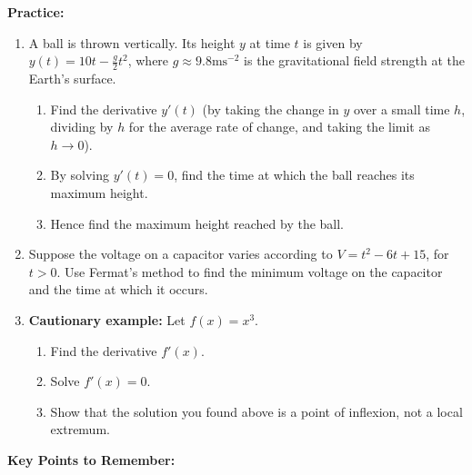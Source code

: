 \documentclass{article}
\begin{document}
\clearpage




\textbf{Practice:}

\vspace{5mm}


\begin{enumerate}
	\item A ball is thrown vertically. Its height $y$ at time $t$ is given by $y(t)=10t-\frac{g}{2}t^2$, where $g\approx 9.8\mathrm{ms}^{-2}$ is the gravitational field strength at the Earth's surface.
		\begin{enumerate}
			\item Find the derivative $y'(t)$ (by taking the change in $y$ over a small time $h$, dividing by $h$ for the average rate of change, and taking the limit as $h\to 0$).
			\item By solving $y'(t)=0$, find the time at which the ball reaches its maximum height.
			\item Hence find the maximum height reached by the ball.
		\end{enumerate}
	\item Suppose the voltage on a capacitor varies according to $V=t^2-6t+15$, for $t>0$. Use Fermat's method to find the minimum voltage on the capacitor and the time at which it occurs.
	\item \textbf{Cautionary example:} Let $f(x)=x^3$.
		\begin{enumerate}
			\item Find the derivative $f'(x)$.
			\item Solve $f'(x)=0$.
			\item Show that the solution you found above is a point of inflexion, not a local extremum.
		\end{enumerate}
\end{enumerate}






\clearpage


{\bf Key Points to Remember:}

\vspace{5mm}
\end{document}
